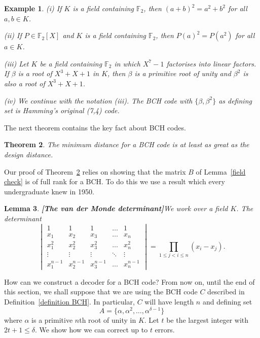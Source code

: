 \documentclass[12pt,a4paper]{article}
\theoremstyle{plain}
\newtheorem{theorem}{Theorem}[section]
\newtheorem{lemma}[theorem]{Lemma}
\newtheorem{example}[theorem]{Example}
\theoremstyle{definition}
\begin{document}
\begin{example}\label{Hamming BCH}
(i) If $K$ is a field containing
${\mathbb F}_{2}$, then $(a+b)^{2}=a^{2}+b^{2}$
for all $a,b\in K$.

(ii) If $P\in {\mathbb F}_{2}[X]$ and $K$ is a field containing
${\mathbb F}_{2}$, then $P(a)^{2}=P(a^{2})$
for all $a\in K$.

(iii) Let $K$ be a field containing
${\mathbb F}_{2}$ in which $X^{7}-1$ factorises
into linear factors. If $\beta$ is a root of $X^{3}+X+1$
in $K$, then $\beta$ is a primitive root of unity
and $\beta^{2}$ is also a root of $X^{3}+X+1$.

(iv) We continue with the notation (iii).
The BCH
code with $\{\beta,\beta^{2}\}$ as defining set
is Hamming's original (7,4) code.
\end{example}

The next theorem contains the key fact about BCH codes.
\begin{theorem}\label{BCH}
The minimum distance for a BCH code
is at least as great as the design distance.
\end{theorem}

Our proof of Theorem~\ref{BCH} relies on showing that
the matrix $B$ of Lemma~\ref{field check} is of full rank
for a BCH. To do this we use a result which every undergraduate
knew in 1950.
\begin{lemma}{\bf [The van der Monde determinant]}\label{L;van der Monde}
We work over a field $K$. The determinant
\begin{equation*}
\begin{vmatrix}
1&1&1&\hdots&1\\
x_{1}&x_{2}&x_{3}&\hdots&x_{n}\\
x_{1}^{2}&x_{2}^{2}&x_{3}^{2}&\hdots&x_{n}^{2}\\
\vdots&\vdots&\vdots&\ddots&\vdots\\
x_{1}^{n-1}&x_{2}^{n-1}&x_{3}^{n-1}&\hdots&x_{n}^{n-1}
\end{vmatrix}
=\prod_{1\leq j<i\leq n}(x_{i}-x_{j}).
\end{equation*}
\end{lemma}

How can we construct a decoder for a BCH code? From
now on, until the end of this section, we shall
suppose that we are using the BCH code $C$ described
in Definition~\ref{definition BCH}. In
particular, $C$ will have length $n$ and
defining set
\[A=\{\alpha,\alpha^{2},\dots,\alpha^{\delta-1}\}\]
where $\alpha$ is a primitive $n$th root of unity
in $K$. Let $t$ be the largest integer with $2t+1\leq\delta$.
We show how we can correct up to $t$ errors.
\end{document}
